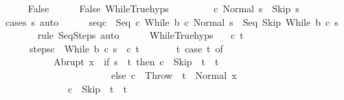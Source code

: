 \begin{isabellebody}
\ \ \ \ \isamarkupfalse%
\ False\isanewline
\ \ \ \ \isamarkupfalse%
\ False\ WhileTrue{\isachardot}hyps\ {\isacharparenleft}{}{\isacharparenright}\ \isanewline
\ \ \ \ \isamarkupfalse%
\ {\isachardoublequoteopen}{\isasymGamma}{\isasymturnstile}\ {\isacharparenleft}c{\isacharcomma}\ Normal\ s{\isacharparenright}\ {\isasymrightarrow}\isactrlsup {\isacharasterisk}\ {\isacharparenleft}Skip{\isacharcomma}\ s{\isacharprime}{\isacharparenright}{\isachardoublequoteclose}\isanewline
\ \ \ \ \ \ \isamarkupfalse%
\ {\isacharparenleft}cases\ s{\isacharprime}{\isacharparenright}\ auto\isanewline
\ \ \ \ \isamarkupfalse%
\ seq{\isacharunderscore}c{\isacharcolon}\ {\isachardoublequoteopen}{\isasymGamma}{\isasymturnstile}\ {\isacharparenleft}Seq\ c\ {\isacharparenleft}While\ b\ c{\isacharparenright}{\isacharcomma}\ Normal\ s{\isacharparenright}\ {\isasymrightarrow}\isactrlsup {\isacharasterisk}\ {\isacharparenleft}Seq\ Skip\ {\isacharparenleft}While\ b\ c{\isacharparenright}{\isacharcomma}\ s{\isacharprime}{\isacharparenright}{\isachardoublequoteclose}\isanewline
\ \ \ \ \ \ \isamarkupfalse%
\ {\isacharparenleft}rule\ SeqSteps{\isacharparenright}\ auto\isanewline
\ \ \ \ \isamarkupfalse%
\ WhileTrue{\isachardot}hyps\ {\isacharparenleft}{}{\isacharparenright}\ \isamarkupfalse%
\ c{\isacharprime}\ t{\isacharprime}\ \isanewline
\ \ \ \ \ \ steps{\isacharunderscore}c\ {\isachardoublequoteopen}{\isasymGamma}{\isasymturnstile}\ {\isacharparenleft}While\ b\ c{\isacharcomma}\ s{\isacharprime}{\isacharparenright}\ {\isasymrightarrow}\isactrlsup {\isacharasterisk}\ {\isacharparenleft}c{\isacharprime}{\isacharcomma}\ t{\isacharprime}{\isacharparenright}{\isachardoublequoteclose}\ \isanewline
\ \ \ \ \ \ t{\isacharcolon}\ {\isachardoublequoteopen}{\isacharparenleft}case\ t\ of\isanewline
\ \ \ \ \ \ \ \ \ \ \ Abrupt\ x\ {\isasymRightarrow}\ if\ s{\isacharprime}\ {\isacharequal}\ t\ then\ c{\isacharprime}\ {\isacharequal}\ Skip\ {\isasymand}\ t{\isacharprime}\ {\isacharequal}\ t\ \isanewline
\ \ \ \ \ \ \ \ \ \ \ \ \ \ \ \ \ \ \ \ \ \ \ else\ c{\isacharprime}\ {\isacharequal}\ Throw\ {\isasymand}\ t{\isacharprime}\ {\isacharequal}\ Normal\ x\isanewline
\ \ \ \ \ \ \ \ \ \ \ {\isacharbar}\ {\isacharunderscore}\ {\isasymRightarrow}\ c{\isacharprime}\ {\isacharequal}\ Skip\ {\isasymand}\ t{\isacharprime}\ {\isacharequal}\ t{\isacharparenright}{\isachardoublequoteclose}\isanewline

\end{isabellebody}
